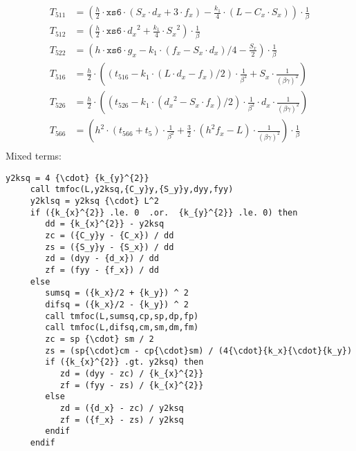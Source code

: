 \documentclass{cern-art} %
\begin{document}
\[
\begin{array}{rl}
     T_{511} &= \left(\frac{h}{2}{\cdot}\texttt{xs6} {\cdot} \left({S_x}{\cdot}{d_x} + 3{\cdot}{f_x}\right) -  {\frac{k_1}{4}} {\cdot} \left(L - {C_x}{\cdot}{S_x}\right)\right) {\cdot} {\frac 1 \beta}\\
     T_{512} &= \left(\frac{h}{2}{\cdot}\texttt{xs6}{\cdot}{d_x}^2 + {\frac{k_1}{4}}{\cdot}{S_x}^2\right) {\cdot} {\frac 1 \beta}\\
     T_{522} &= \left(h{\cdot}\texttt{xs6}{\cdot}{g_x} - {k_1} {\cdot} \left({f_x} - {S_x}{\cdot}{d_x}\right) / 4 - \frac{S_x}{2}\right) {\cdot} {\frac 1 \beta}\\
     T_{516} &= \frac{h}{2} {\cdot} \left(\left(t_{516} - {k_1} {\cdot} \left(L{\cdot}{d_x} - {f_x}\right) / 2\right) {\cdot} {\frac 1{\beta^2}} + {S_x} {\cdot} \frac 1 {{\left(\beta\gamma\right)}^2}\right)\\
     T_{526} &= \frac{h}{2} {\cdot} \left(\left(t_{526} - {k_1} {\cdot} \left({d_x}^2 - {S_x}{\cdot}{f_x}\right) / 2\right) {\cdot} {\frac 1{\beta^2}} {\cdot} {d_x} {\cdot} \frac 1 {{\left(\beta\gamma\right)}^2}\right)\\
     T_{566} &= \left(h^2 {\cdot} \left(t_{566} + t_5\right) {\cdot} {\frac 1{\beta^2}} + \frac{3}{2} {\cdot} \left(h^2 {f_x} - L\right) {\cdot} \frac 1 {{\left(\beta\gamma\right)}^2}\right) {\cdot} {\frac 1 \beta}\\
\end{array}
\]
Mixed terms:
\begin{lstlisting}[firstnumber=last]
     y2ksq = 4 {\cdot} {k_{y}^{2}}
     call tmfoc(L,y2ksq,{C_y}y,{S_y}y,dyy,fyy)
     y2klsq = y2ksq {\cdot} L^2
     if ({k_{x}^{2}} .le. 0  .or.  {k_{y}^{2}} .le. 0) then
        dd = {k_{x}^{2}} - y2ksq
        zc = ({C_y}y - {C_x}) / dd
        zs = ({S_y}y - {S_x}) / dd
        zd = (dyy - {d_x}) / dd
        zf = (fyy - {f_x}) / dd
     else
        sumsq = ({k_x}/2 + {k_y}) ^ 2
        difsq = ({k_x}/2 - {k_y}) ^ 2
        call tmfoc(L,sumsq,cp,sp,dp,fp)
        call tmfoc(L,difsq,cm,sm,dm,fm)
        zc = sp {\cdot} sm / 2
        zs = (sp{\cdot}cm - cp{\cdot}sm) / (4{\cdot}{k_x}{\cdot}{k_y})
        if ({k_{x}^{2}} .gt. y2ksq) then
           zd = (dyy - zc) / {k_{x}^{2}}
           zf = (fyy - zs) / {k_{x}^{2}}
        else
           zd = ({d_x} - zc) / y2ksq
           zf = ({f_x} - zs) / y2ksq
        endif
     endif
     \end{lstlisting}
\end{document}
